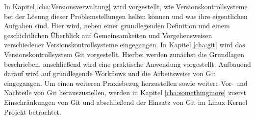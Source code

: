 In Kapitel \ref{cha:Versionsverwaltung} wird vorgestellt, wie
Versionskontrollsysteme bei der Lösung dieser Problemstellungen helfen können
und was ihre eigentlichen Aufgaben sind. Hier wird, neben einer grundlegenden
Definition und einem geschichtlichen Überblick auf Gemeinsamkeiten und
Vorgehensweisen verschiedener Versionskontrollsysteme eingegangen. In Kapitel
\ref{cha:git} wird das Versionskontrollsystem Git vorgestellt. Hierbei werden
zunächst die Grundlagen beschrieben, anschließend wird eine praktische
Anwendung vorgestellt. Aufbauend darauf wird auf grundlegende Workflows und die
Arbeitsweise von Git eingegangen. Um einen weiteren Praxisbezug herzustellen
sowie weitere Vor- und Nachteile von Git herauszustellen, werden in Kapitel
\ref{cha:somethingmore} zuerst Einschränkungen von Git und abschließend der Einsatz
von Git im Linux Kernel Projekt betrachtet.
